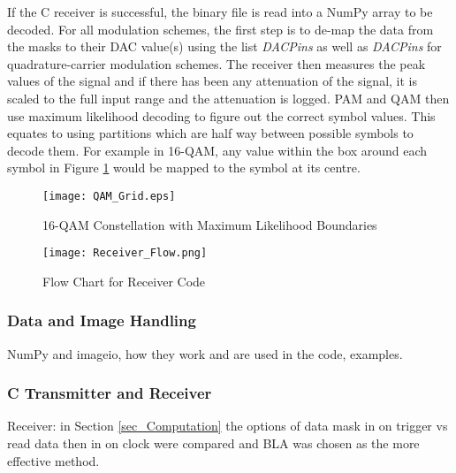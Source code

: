 \documentclass[../main.tex]{subfiles}
\begin{document}
If the C receiver is successful, the binary file is read into a NumPy array to be decoded.
For all modulation schemes, the first step is to de-map the data from the masks to their DAC value(s) using the list \textit{DAC\textunderscore Pins} as well as \textit{DAC\textunderscore Pins} for quadrature-carrier modulation schemes.
The receiver then measures the peak values of the signal and if there has been any attenuation of the signal, it is scaled to the full input range and the attenuation is logged.
PAM and QAM then use maximum likelihood decoding to figure out the correct symbol values.
This equates to using partitions which are half way between possible symbols to decode them.
For example in 16-QAM, any value within the box around each symbol in Figure \ref{fig_QAM ML Decoding} would be mapped to the symbol at its centre.

\begin{figure}[ht]
	\centering
	\texttt{[image: QAM\_Grid.eps]}
	\caption{16-QAM Constellation with Maximum Likelihood Boundaries}
	\label{fig_QAM ML Decoding}
\end{figure}

\begin{figure}[ht]
	\centering
	\texttt{[image: Receiver\_Flow.png]}
	\caption{Flow Chart for Receiver Code}
	\label{fig_Receiver_Flow}
\end{figure}



\subsubsection{Data and Image Handling}

NumPy and imageio, how they work and are used in the code, examples.\\

\subsubsection{C Transmitter and Receiver} \label{sec_C Transmitter and Receiver}

Receiver: in Section \ref{sec_Computation} the options of data mask in on trigger vs read data then in on clock were compared and BLA was chosen as the more effective method.
\end{document}
